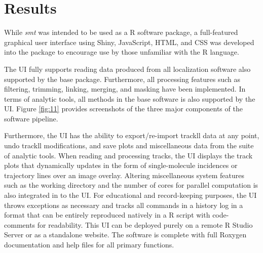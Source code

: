 \documentclass{bioinfo}
\begin{document}
\section{Results}

While \textit{smt} was intended to be used as a R software package, a full-featured graphical user interface using Shiny, JavaScript, HTML, and CSS was developed into the package to encourage use by those unfamiliar with the R language. 

The UI fully supports reading data produced from all localization software also supported by the base package. Furthermore, all processing features such as filtering, trimming, linking, merging, and masking have been implemented. In terms of analytic tools, all methods in the base software is also supported by the UI. Figure \ref{fig:11} provides screenshots of the three major components of the software pipeline.

Furthermore, the UI has the ability to export/re-import trackll data at any point, undo trackll modifications, and save plots and miscellaneous data from the suite of analytic tools. When reading and processing tracks, the UI displays the track plots that dynamically updates in the form of single-molecule incidences or trajectory lines over an image overlay. Altering miscellaneous system features such as the working directory and the number of cores for parallel computation is also integrated in to the UI. For educational and record-keeping purposes, the UI throws exceptions as necessary and tracks all commands in a history log in a format that can be entirely reproduced natively in a R script with code-comments for readability. This UI can be deployed purely on a remote R Studio Server or as a standalone website. The software is complete with full Roxygen documentation and help files for all primary functions.
\end{document}
